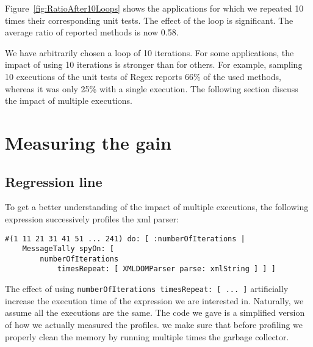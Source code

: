 \documentclass{sig-alternate}
\newcommand{\ct}{\lstinline[backgroundcolor=\color{white},basicstyle=\footnotesize\ttfamily]}
\newcommand{\seclabel}[1]{\label{sec:#1}}
\newcommand{\figref}[1]{Figure~\ref{fig:#1}}
\begin{document}
\figref{RatioAfter10Loops} shows the applications for which we repeated 10 times their corresponding unit tests. The effect of the loop is significant. The average ratio of reported methods is now 0.58. 

We have arbitrarily chosen a loop of 10 iterations. For some applications, the impact of using 10 iterations is stronger than for others. For example, sampling 10 executions of the unit tests of Regex reports 66\% of the used methods, whereas it was only 25\% with a single execution. The following section discuss the impact of multiple executions.

\section{Measuring the gain} \seclabel{measuringTheGain}
 
\subsection{Regression line}

To get a better understanding of the impact of multiple executions, the following expression successively profiles the xml parser:

\begin{lstlisting}
#(1 11 21 31 41 51 ... 241) do: [ :numberOfIterations |
	MessageTally spyOn: [  
		numberOfIterations 
			timesRepeat: [ XMLDOMParser parse: xmlString ] ] ]
\end{lstlisting}

The effect of using \ct{numberOfIterations timesRepeat: [ ... ]} artificially increase the execution time of the expression we are interested in. Naturally, we assume all the executions are the same. The code we gave is a simplified version of how we actually measured the profiles. we make sure that before profiling we properly clean the memory by running multiple times the garbage collector.

%
\end{document}
